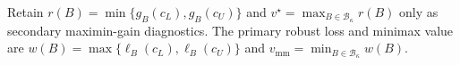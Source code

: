 Retain \(r(B)=\min\{g_B(c_L),g_B(c_U)\}\) and \(v^\star=\max_{B\in\mathcal B_\kappa}r(B)\) only as secondary maximin-gain diagnostics.  The primary robust loss and minimax value are \(w(B)=\max\{\ell_B(c_L),\ell_B(c_U)\}\) and \(v_{\mathrm{mm}}=\min_{B\in\mathcal B_\kappa}w(B)\).